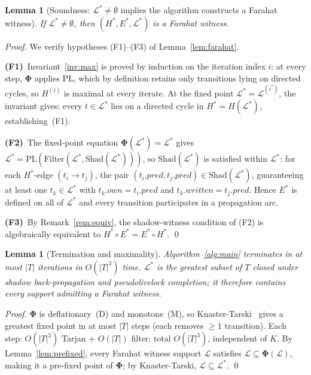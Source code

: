 \documentclass{article}
\newtheorem{lemma}[theorem]{Lemma}
\newcommand{\Ls}{\mathcal{L}^{*}}
\newcommand{\Li}[1]{\mathcal{L}^{(#1)}}   %
\newcommand{\Hi}[1]{H^{(#1)}}             %
\newcommand{\PL}{\mathrm{PL}}
\newcommand{\Shad}{\mathrm{Shad}}
\newcommand{\Filter}{\mathrm{Filter}}
\newcommand{\bPhi}{\boldsymbol{\Phi}}
\newcommand{\Hstar}{H^{*}}
\newcommand{\Estar}{E^{*}}
\newcommand{\own}{\mathit{own}}
\newcommand{\writ}{\mathit{written}}
\newcommand{\pred}{\mathit{pred}}
\begin{document}
\begin{lemma}[Soundness: $\Ls\neq\emptyset$ implies the algorithm constructs a Farahat witness]
\label{lem:witness}
If $\Ls\neq\emptyset$, then $(\Hstar,\Estar,\Ls)$ is a Farahat witness.
\end{lemma}

\begin{proof}
We verify hypotheses (F1)--(F3) of Lemma~\ref{lem:farahat}.

\textbf{(F1)}~Invariant~\ref{inv:max} is proved by induction on the
iteration index $i$: at every step, $\bPhi$ applies $\PL$, which by
definition retains only transitions lying on directed cycles, so
$\Hi{i}$ is maximal at every iterate.  At the fixed point
$\Ls=\Li{i^*}$, the invariant gives: every $t\in\Ls$ lies on a
directed cycle in $\Hstar=H(\Ls)$, establishing~(F1).

\textbf{(F2)}~The fixed-point equation $\bPhi(\Ls)=\Ls$ gives
$\Ls=\PL(\Filter(\Ls,\Shad(\Ls)))$, so $\Shad(\Ls)$ is satisfied within
$\Ls$: for each $\Hstar$-edge $(t_i\!\to\!t_j)$, the pair
$(t_i.\pred,t_j.\pred)\in\Shad(\Ls)$, guaranteeing at least one
$t_k\in\Ls$ with $t_k.\own=t_i.\pred$ and $t_k.\writ=t_j.\pred$.  Hence $\Estar$ is
defined on all of $\Ls$ and every transition participates in a
propagation arc.

\textbf{(F3)}~By Remark~\ref{rem:equiv}, the shadow-witness condition
of (F2) is algebraically equivalent to
$\Hstar\circ\Estar=\Estar\circ\Hstar$. \qed
\end{proof}

\begin{lemma}[Termination and maximality]
\label{lem:termination}
Algorithm~\ref{alg:main} terminates in at most $|T|$ iterations in
$O(|T|^3)$ time.  $\Ls$ is the greatest subset of $T$ closed under
shadow back-propagation and pseudolivelock completion; it therefore
contains every support admitting a Farahat witness.
\end{lemma}

\begin{proof}
$\bPhi$ is deflationary~(D) and monotone~(M), so
Knaster-Tarski~\citep{tarski1955} gives a greatest fixed point in at
most $|T|$ steps (each removes $\geq 1$ transition).  Each step:
$O(|T|^2)$ Tarjan $+$ $O(|T|)$ filter; total $O(|T|^3)$, independent
of $K$.  By Lemma~\ref{lem:prefixed}, every Farahat witness support
$\mathcal{L}$ satisfies $\mathcal{L}\subseteq\bPhi(\mathcal{L})$,
making it a pre-fixed point of $\bPhi$; by Knaster-Tarski,
$\mathcal{L}\subseteq\Ls$. \qed
\end{proof}
\end{document}
